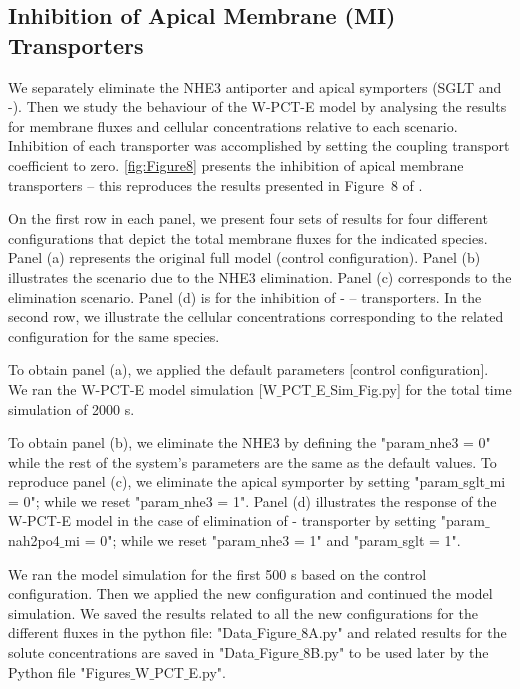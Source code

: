 \documentclass[fleqn,10pt]{physiome}
\begin{document}
\subsection{Inhibition of Apical Membrane (MI) Transporters}
\label{Apical Membrane Transporters}
We separately eliminate the NHE3 antiporter and apical symporters (SGLT and -). Then we study the behaviour of the W-PCT-E model by analysing the results for membrane fluxes and cellular concentrations relative to each scenario. Inhibition of each transporter was accomplished by setting the
coupling transport coefficient to zero. \autoref{fig:Figure8} presents the inhibition of apical membrane
transporters – this reproduces the results presented in Figure~8 of \cite{noroozbabaee2022modular}.

On the first row in each panel, we present four sets of results for four different configurations
that depict the total membrane fluxes for the indicated species.
Panel (a) represents the original
full model (control configuration). Panel (b) illustrates the scenario due to the  \si{NHE3} elimination. Panel (c) corresponds to the  elimination scenario. Panel
(d) is for the inhibition of - – transporters. In the second row, we illustrate the cellular concentrations corresponding to the related configuration for the same species.

To obtain panel (a), we applied the default parameters [control configuration]. We ran the W-PCT-E model simulation [W$\_$PCT$\_$E$\_$Sim$\_$Fig.py] for the total time simulation of 2000 s.

To obtain panel (b), we eliminate the \si{NHE3} by defining the "param$\_$nhe3 = 0" while the rest of the system's parameters are the same as the default values. To reproduce panel (c), we eliminate the apical symporter   by setting "param$\_$sglt$\_$mi = 0";
while we reset "param$\_$nhe3 = 1".   Panel (d) illustrates the response of the W-PCT-E model in the case of elimination of - transporter by setting "param$\_$nah2po4$\_$mi = 0"; while we reset "param$\_$nhe3 = 1" and "param$\_$sglt = 1". 

We ran the model simulation for the first 500 s based on the control configuration. Then we applied the new configuration and continued the model simulation. We saved the results related to all the new configurations for the different fluxes in the python file: "Data$\_$Figure$\_$8A.py" and related results for the solute concentrations are saved in "Data$\_$Figure$\_$8B.py" to be used later by the Python file "Figures$\_$W$\_$PCT$\_$E.py".
\end{document}
